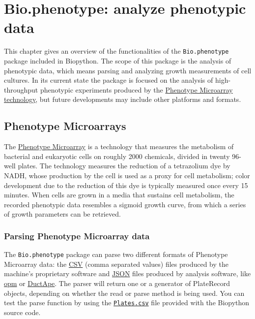 \chapter{Bio.phenotype: analyze phenotypic data}
\label{chapter:phenotype}

This chapter gives an overview of the functionalities of the
\verb|Bio.phenotype| package included in Biopython. The scope of this
package is the analysis of phenotypic data, which means parsing and
analyzing growth measurements of cell cultures.
In its current state the package is focused on the analysis of
high-throughput phenotypic experiments produced by the
\href{https://en.wikipedia.org/wiki/Phenotype_microarray}{Phenotype Microarray technology},
but future developments may include other platforms and formats.

\section{Phenotype Microarrays}
\label{sec:phenotypemicroarrays}

The \href{https://en.wikipedia.org/wiki/Phenotype_microarray}{Phenotype Microarray}
is a technology that measures the metabolism of bacterial
and eukaryotic cells on roughly 2000 chemicals, divided in twenty 96-well
plates.
The technology measures the reduction of a tetrazolium dye by
NADH, whose production by the cell is used as a proxy for cell metabolism;
color development due to the reduction of this dye is typically measured
once every 15 minutes.
When cells are grown in a media that sustains cell metabolism, the
recorded phenotypic data resembles a sigmoid growth curve, from which a
series of growth parameters can be retrieved.

\subsection{Parsing Phenotype Microarray data}

The \verb|Bio.phenotype| package can parse two different formats of
Phenotype Microarray data: the
\href{https://en.wikipedia.org/wiki/Comma-separated_values}{CSV}
(comma separated values) files produced by the machine's proprietary
software and \href{https://en.wikipedia.org/wiki/JSON}{JSON}
files produced by analysis software, like
\href{https://www.dsmz.de/research/microorganisms/projects/analysis-of-omnilog-phenotype-microarray-data.html}{opm}
or \href{https://combogenomics.github.io/DuctApe/}{DuctApe}.
The parser will return one or a generator of PlateRecord objects, depending
on whether the read or parse method is being used.
You can test the parse function by using the \href{https://github.com/biopython/biopython/blob/master/Doc/examples/Plates.csv}{\texttt{Plates.csv}} file provided with the Biopython source code.

